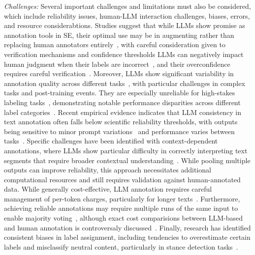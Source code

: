 \documentclass[11pt]{article}
\begin{document}
\emph{Challenges:} Several important challenges and limitations must also be considered, which include reliability issues, human-LLM interaction challenges, biases, errors, and resource considerabtions.
Studies suggest that while LLMs show promise as annotation tools in SE, their optimal use may be in augmenting rather than replacing human annotators entirely~\cite{DBLP:conf/emnlp/WangLXZZ21, DBLP:conf/chi/HeHDRH24}, with careful consideration given to verification mechanisms and confidence thresholds
LLMs can negatively impact human judgment when their labels are incorrect~\cite{DBLP:conf/www/HuangKA23a}, and their overconfidence requires careful verification~\cite{DBLP:conf/kdd/WanSJKCNSSWYABJ24}.
Moreover, LLMs show significant variability in annotation quality across different tasks~\cite{DBLP:conf/www/HuangKA23a,DBLP:conf/chi/Wang0RMM24}, with particular challenges in complex tasks and post-training events. They are especially unreliable for high-stakes labeling tasks~\cite{DBLP:conf/chi/Wang0RMM24}, demonstrating notable performance disparities across different label categories~\cite{DBLP:journals/corr/abs-2304-10145}. Recent empirical evidence indicates that LLM consistency in text annotation often falls below scientific reliability thresholds, with outputs being sensitive to minor prompt variations~\cite{DBLP:journals/corr/abs-2304-11085} and performance varies between tasks~\cite{DBLP:journals/corr/abs-2306-00176}. Specific challenges have been identified with context-dependent annotations, where LLMs show particular difficulty in correctly interpreting text segments that require broader contextual understanding~\cite{DBLP:conf/chi/HeHDRH24}.
While pooling multiple outputs can improve reliability, this approach necessitates additional computational resources and still requires validation against human-annotated data.
While generally cost-effective, LLM annotation requires careful management of per-token charges, particularly for longer texts~\cite{DBLP:conf/emnlp/WangLXZZ21}. Furthermore, achieving reliable annotations may require multiple runs of the same input to enable majority voting~\cite{DBLP:journals/corr/abs-2304-11085}, although exact cost comparisions between LLM-based and human annotation is controversaly discussed~\cite{DBLP:conf/chi/HeHDRH24}.
Finally, research has identified consistent biases in label assignment, including tendencies to overestimate certain labels and misclassify neutral content, particularly in stance detection tasks~\cite{DBLP:journals/corr/abs-2304-10145}. %
\end{document}
